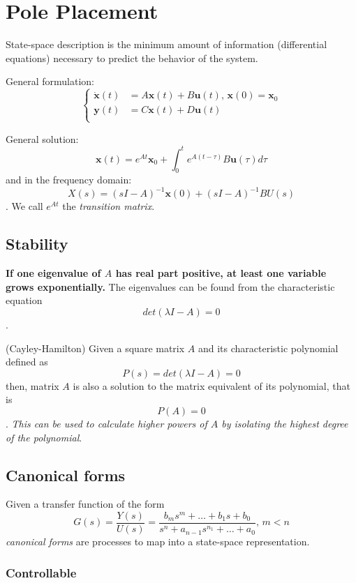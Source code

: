 \documentclass[a4paper]{report}
\begin{document}
\section*{Pole Placement}

State-space description is the minimum amount of information (differential equations) necessary to predict the behavior of the system.

General formulation: \[
\begin{cases}
    \dot{\bm{x}}(t) &= A\bm{x}(t) + B\bm{u}(t)\text{,  }\bm{x}(0) = \bm{x}_0 \\
    \bm{y}(t) &= C\bm{x}(t) + D\bm{u}(t) \\
\end{cases}
\] 

General solution: \[
    \bm{x}(t) = e^{At}\bm{x}_0 + \int_0^{t} e^{A\left( t-\tau \right) }B\bm{u}(\tau)d\tau
\] and in the frequency domain: \[
X(s) = (sI-A)^{-1}\bm{x}(0) + (sI-A)^{-1}BU(s)
\]. We call $e^{At}$ the \emph{transition matrix}.

\subsection*{Stability}

\textbf{If one eigenvalue of $A$ has real part positive, at least one variable grows exponentially.} The eigenvalues can be found from the characteristic equation \[
det\left( \lambda I - A \right) = 0
\].

\begin{definition}
    (Cayley-Hamilton) Given a square matrix $A$ and its characteristic polynomial defined as \[
    P(s) = det\left( \lambda I - A \right) = 0
    \] then, matrix $A$ is also a solution to the matrix equivalent of its polynomial, that is \[
    P(A) = 0
\]. \emph{This can be used to calculate higher powers of $A$ by isolating the highest degree of the polynomial}.
\end{definition}

\subsection*{Canonical forms}

Given a transfer function of the form \[
    G(s) = \frac{Y(s)}{U(s)} = \frac{b_ms^{m}+\ldots+b_1s + b_0}{s^{n}+a_{n-1}s^{n_1}+\ldots+a_0}\text{, }m<n
\] \emph{canonical forms} are processes to map into a state-space representation.

\subsubsection*{Controllable}
\end{document}
